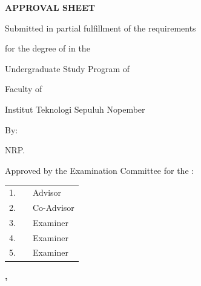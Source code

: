 \begin{center}
  \textbf{APPROVAL SHEET}\par
  \vspace{\baselineskip}
  \vspace{\baselineskip}
  \textbf{\MakeUppercase{\engtatitle{}}}\par
  \vspace{\baselineskip}
  \textbf{\engdoctypename{}}\par
  Submitted in partial fulfillment of the requirements\par
  for the degree of \engdegree{} in the\par
  Undergraduate Study Program of \engstudyprogram{}\par
  Faculty of \engfaculty{}\par
  Institut Teknologi Sepuluh Nopember\par
  \vspace{\baselineskip}
  By: \textbf{\MakeUppercase{\name{}}}\par
  NRP. \nrp{}\par
  \vspace{\baselineskip}
  Approved by the Examination Committee for the \engdoctypename{}:
\end{center}

\begingroup
\renewcommand{\arraystretch}{2.2}
\noindent
\begin{tabularx}{\textwidth}{@{}r X p{}@{}}
  1. & \advisor{}     & Advisor \\
  2. & \coadvisor{}   & Co-Advisor \\
  3. & \examinerone{} & Examiner \\
  4. & \examinertwo{} & Examiner \\
  5. & \examinerthree{} & Examiner
\end{tabularx}
\endgroup

\vspace{\baselineskip}

\begin{center}
  \textbf{\MakeUppercase{\place{}}}\par
  \textbf{\ENGMONTH{}, \the\year{}}
\end{center}

